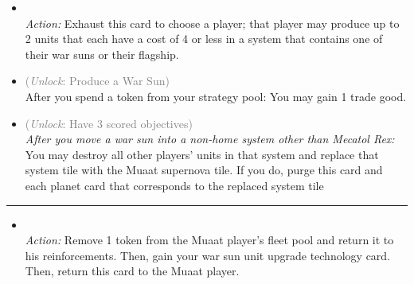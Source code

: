 \begin{multicols}{2}
\begin{itemize}
\item {}\\
\emph{Action:} Exhaust this card to choose a player; that player may produce up to 2 units that each have a cost of 4 or less in a system that contains one of their war suns or their flagship.
\item {} \textcolor{gray}{(\emph{Unlock}: Produce a War Sun)}\\
After you spend a token from your strategy pool: You may gain 1 trade good.
\item {} \textcolor{gray}{(\emph{Unlock}: Have 3 scored objectives)}\\
\emph{After you move a war sun into a non-home system other than Mecatol Rex:}\\
You may destroy all other players' units in that system and replace that system tile with the Muaat supernova tile. If you do, purge this card and each planet card that corresponds to the replaced system tile
\end{itemize}

\vspace{-10pt}\rule{\hsize}{0.4pt}\vspace{5pt}


\begin{itemize}
\item {}\\
\emph{Action:}
Remove 1 token from the Muaat player's fleet pool and return it to his reinforcements. Then, gain your war sun unit upgrade technology card.\\
Then, return this card to the Muaat player.
\end{itemize}

\end{multicols}



